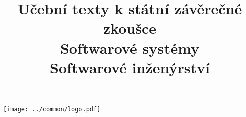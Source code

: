 \clearpage

\clearpage

\title{\LARGE Učební texty k státní závěrečné zkoušce \\ Softwarové systémy \\ Softwarové inženýrství}




\maketitle

\vspace{10mm}
\begin{center}
\texttt{[image: ../common/logo.pdf]}
\end{center} 

\clearpage

\clearpage

\tableofcontents







